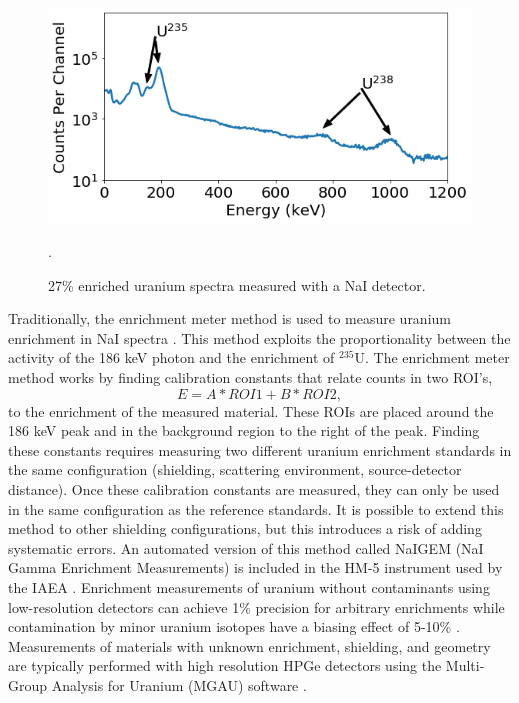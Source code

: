 \begin{figure}[H]
	\centering
	\includegraphics[width=0.8\linewidth]{images/enriched_u_peaks_displayed}
	\caption{27\% enriched uranium spectra measured with a NaI detector.}.
	\label{fig:enriched_u_peaks_displayed}
\end{figure}

Traditionally, the enrichment meter method is used to measure uranium enrichment in NaI spectra \cite{Reilly1970}. This method exploits the proportionality between the activity of the 186 keV photon and the enrichment of $^{235}$U. The enrichment meter method works by finding calibration constants that relate counts in two ROI's,
%
\begin{equation} \label{eq:enrichment_meter_principle}
E = A * ROI1 + B * ROI2,
\end{equation}
%
to the enrichment of the measured material. These ROIs are placed around the 186 keV peak and in the background region to the right of the peak. Finding these constants requires measuring two different uranium enrichment standards in the same configuration (shielding, scattering environment, source-detector distance). Once these calibration constants are measured, they can only be used in the same configuration as the reference standards. It is possible to extend this method to other shielding configurations, but this introduces a risk of adding systematic errors. An automated version of this method called NaIGEM (NaI Gamma Enrichment Measurements) is included in the HM-5 instrument used by the IAEA \cite{MORTREAU2004}. Enrichment measurements of uranium without contaminants using low-resolution detectors can achieve 1\% precision for arbitrary enrichments while  contamination by minor uranium isotopes have a biasing effect of 5-10\% \cite{SPRINKLE1997}. Measurements of materials with unknown enrichment, shielding, and geometry are typically performed with high resolution HPGe detectors using the Multi-Group Analysis for Uranium (MGAU) software \cite{MGAU1994}.

